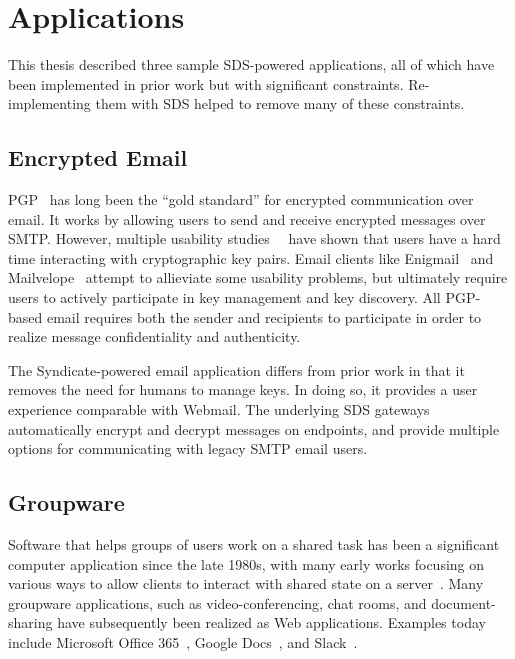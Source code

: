 \section{Applications}

This thesis described three sample SDS-powered applications, all of which have been
implemented in prior work but with significant constraints.  Re-implementing
them with SDS helped to remove many of these constraints.

\subsection{Encrypted Email}

PGP~\cite{pgp} has long been the ``gold standard'' for encrypted communication
over email.  It works by allowing users to send and receive encrypted messages
over SMTP.  However, multiple usability
studies~\cite{why-johnny-cant-encrypt}~\cite{why-johnny-still-still-cant-encrypt}
have shown that users have a hard time interacting with cryptographic key pairs.
Email clients like Enigmail~\cite{enigmail} and Mailvelope~\cite{mailvelope}
attempt to allieviate some usability problems, but ultimately require users to
actively participate in key management and key discovery.  All PGP-based email
requires both the sender and recipients to participate in order to realize
message confidentiality and authenticity.

The Syndicate-powered email application differs from prior work in that it removes the
need for humans to manage keys.  In doing so, it provides a user experience
comparable with Webmail.  The underlying SDS gateways automatically encrypt and
decrypt messages on endpoints, and provide multiple options for communicating
with legacy SMTP email users.

\subsection{Groupware}

Software that helps groups of users work on a shared task has been a significant
computer application since the late 1980s, with many early works focusing
on various ways to allow clients to interact with shared state on a server~\cite{readings-in-groupware}.
Many groupware applications, such as video-conferencing, chat rooms,
and document-sharing have subsequently been realized as Web applications.
Examples today include Microsoft Office 365~\cite{microsoft-apps}, Google
Docs~\cite{google-docs}, and Slack~\cite{slack}.

